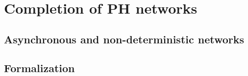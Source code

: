 
\section{Completion of PH networks}
\label{sec:ph-completion}

\subsection{Asynchronous and non-deterministic networks}

\subsection{Formalization}




